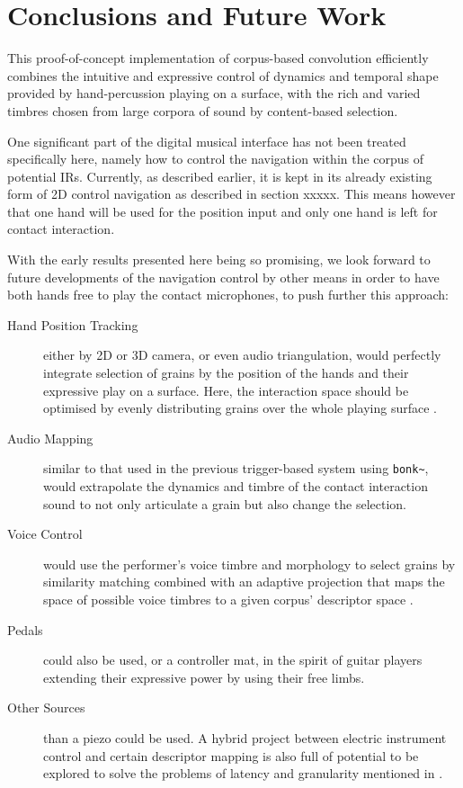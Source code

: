 \section{Conclusions and Future Work}\label{sec:future}

This proof-of-concept implementation of corpus-based convolution efficiently combines the intuitive and expressive control of dynamics and temporal shape provided by hand-percussion playing on a surface, with the rich and varied timbres chosen from large corpora of sound by content-based selection.


One significant part of the digital musical interface has not been treated specifically here, namely how to control the navigation within the corpus of potential IRs. Currently, as described earlier, it is kept in its already existing form of 2D control navigation as described in section xxxxx.
%
This means however that one hand will be used for the position input and only one hand is left for contact interaction.

With the early results presented here being so promising, we look forward to future developments of the navigation control by other means in order to have both hands free to play the contact microphones, to push further this approach:

\begin{description}
\item[Hand Position Tracking] either by 2D or 3D camera, or even audio triangulation, would perfectly integrate selection of grains by the position of the hands and their expressive play on a surface.  Here, the interaction space should be optimised by evenly distributing grains over the whole playing surface \cite{LallemandSchwarz-dafx2011-distribute}.
\item[Audio Mapping] similar to that used in the previous trigger-based system using \verb|bonk~|, would extrapolate the dynamics and timbre of the contact interaction sound to not only articulate a grain but also change the selection.
\item[Voice Control] would use the performer's voice timbre and morphology to select grains by similarity matching combined with an adaptive projection that maps the space of possible voice timbres to a given corpus' descriptor space \cite{StowellPlumbley-smc2010-timbre-remapping-regression-tree,Fasciani-si2013b}.
\item[Pedals] could also be used, or a controller mat, in the spirit of guitar players extending their expressive power by using their free limbs.
\item[Other Sources] than a piezo could be used. A hybrid project between electric instrument control and certain descriptor mapping is also full of potential to be explored to solve the problems of latency and granularity mentioned in \cite{TremblaySchwarz-nime2010-surfing-the-waves}.
\end{description}

